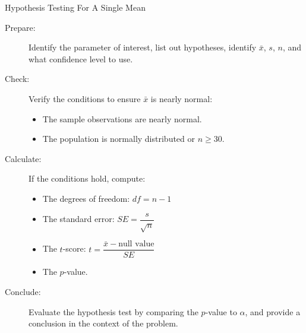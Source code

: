 \documentclass{beamer}
\begin{document}
\begin{frame}
  \begin{block}{Hypothesis Testing For A Single Mean}
    \begin{description}
    \item[Prepare:] Identify the parameter of interest, list out hypotheses, identify $\bar{x}$, $s$, $n$, and what confidence level to use.\pause
    \item[Check:] Verify the conditions to ensure $\bar{x}$ is nearly normal:\pause
      \begin{itemize}
      \item The sample observations are nearly normal.\pause
      \item The population is normally distributed or $n\geq 30$.\pause
      \end{itemize}
    \item[Calculate:] If the conditions hold, compute:\pause
      \begin{itemize}
      \item The degrees of freedom: $df=n-1$\pause
      \item The standard error: $SE=\dfrac{s}{\sqrt{n}}$\pause
      \item The $t$-score: $t = \dfrac{\bar{x} - \text{null value}}{SE}$\pause
      \item The $p$-value.\pause
      \end{itemize}
    \item[Conclude:] Evaluate the hypothesis test by comparing the $p$-value to $\alpha$, and provide a conclusion in the context of the problem.
    \end{description}
  \end{block}
\end{frame}
\end{document}
